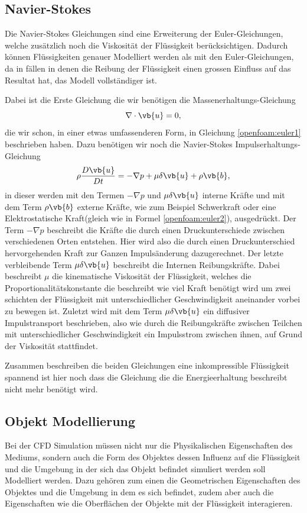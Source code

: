 \subsection{Navier-Stokes}
Die Navier-Stokes Gleichungen sind eine Erweiterung der Euler-Gleichungen, welche zusätzlich noch die Viskosität der Flüssigkeit berücksichtigen.
Dadurch können Flüssigkeiten genauer Modelliert werden als mit den Euler-Gleichungen, da in fällen in denen die Reibung der Flüssigkeit einen grossen Einfluss auf das Resultat hat, das Modell vollständiger ist.

Dabei ist die Erste Gleichung die wir benötigen die Massenerhaltungs-Gleichung 
\[\nabla \cdot \vb{u}
=
0
,
\]
die wir schon, in einer etwas umfassenderen Form, in Gleichung \eqref{openfoam:euler1} beschrieben haben.
Dazu benötigen wir noch die Navier-Stokes Impulserhaltungs-Gleichung 
\begin{equation}
\rho \frac{D\vb{u}}{Dt}
=
- \nabla p + \mu \delta \vb{u} +\rho \vb{b} 
,\end{equation}
in dieser werden mit den Termen $- \nabla p$ und $\mu \delta \vb{u}$ interne Kräfte und mit dem Term $\rho \vb{b}$ externe Kräfte, wie zum Beispiel Schwerkraft oder eine Elektrostatische Kraft(gleich wie in Formel \eqref{openfoam:euler2}), ausgedrückt.
Der Term $- \nabla p$ beschreibt die Kräfte die durch einen Druckunterschiede zwischen verschiedenen Orten entstehen.
Hier wird also die durch einen Druckunterschied hervorgehenden Kraft zur Ganzen Impulsänderung dazugerechnet.
Der letzte verbleibende Term $\mu \delta \vb{u}$ beschreibt die Internen Reibungskräfte.
Dabei beschreibt $\mu$ die kinematische Viskosität der Flüssigkeit, welches die Proportionalitätskonstante die beschreibt wie viel Kraft benötigt wird um zwei schichten der Flüssigkeit mit unterschiedlicher Geschwindigkeit aneinander vorbei zu bewegen ist.
Zuletzt wird mit dem Term $\mu \delta \vb{u}$ ein diffusiver Impulstransport beschrieben, also wie durch die Reibungskräfte zwischen Teilchen mit unterschiedlicher Geschwindigkeit ein Impulsstrom zwischen ihnen, auf Grund der Viskosität stattfindet.

Zusammen beschreiben die beiden Gleichungen eine inkompressible Flüssigkeit spannend ist hier noch dass die  Gleichung die die Energieerhaltung beschreibt nicht mehr benötigt wird. 

\subsection{Objekt Modellierung}
Bei der CFD Simulation müssen nicht nur die Physikalischen Eigenschaften des Mediums, sondern auch die Form des Objektes dessen Influenz auf die Flüssigkeit und die Umgebung in der sich das Objekt befindet simuliert werden soll Modelliert werden.
Dazu gehören zum einen die Geometrischen Eigenschaften des Objektes und die Umgebung in dem es sich befindet, zudem aber auch die Eigenschaften wie die Oberflächen der Objekte mit der Flüssigkeit interagieren.

